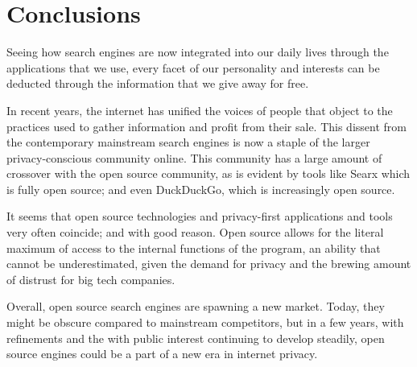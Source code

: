 \pagestyle{conclusions}
\section{Conclusions}
Seeing how search engines are now integrated into our daily lives through the
applications that we use, every facet of our personality and interests can be
deducted through the information that we give away for free.

In recent years, the internet has unified the voices of people that object to
the practices used to gather information and profit from their sale.
This dissent from the contemporary mainstream search engines is now a staple of
the larger privacy-conscious community online.
This community has a large amount of crossover with the open source community,
as is evident by tools like Searx which is fully open source; and even
DuckDuckGo, which is increasingly open source.

It seems that open source technologies and privacy-first applications and tools
very often coincide; and with good reason.
Open source allows for the literal maximum of access to the internal
functions of the program, an ability that cannot be underestimated, given the
demand for privacy and the brewing amount of distrust for big tech companies.

Overall, open source search engines are spawning a new market.
Today, they might be obscure compared to mainstream competitors, but in a few
years, with refinements and the with public interest continuing to develop
steadily, open source engines could be a part of a new era in internet privacy.
